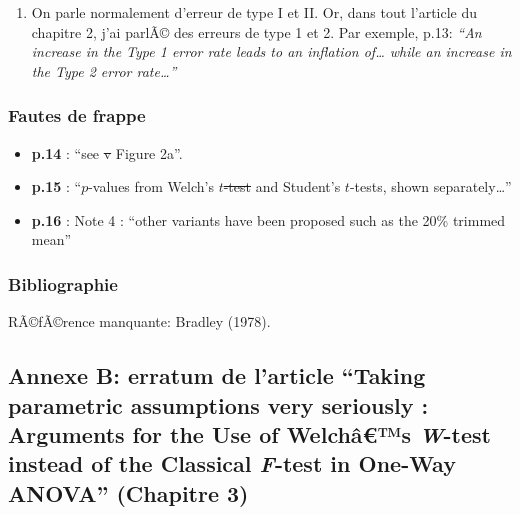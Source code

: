 \begin{appendix}
\begin{enumerate}
\def\labelenumi{\arabic{enumi})}
\setcounter{enumi}{2}
\tightlist
\item
  On parle normalement d'erreur de type I et II. Or, dans tout l'article
  du chapitre 2, j'ai parlÃ© des erreurs de type 1 et 2. Par exemple,
  p.13: \emph{``An increase in the Type 1 error rate leads to an
  inflation of\ldots{} while an increase in the Type 2 error
  rate\ldots{}''}
\end{enumerate}

\hypertarget{fautes-de-frappe}{%
\subsubsection{Fautes de frappe}\label{fautes-de-frappe}}

\begin{itemize}
\tightlist
\item
  \textbf{p.14} : ``see \sout{v} \color{blue}Figure \color{black} 2a''.
\item
  \textbf{p.15} : ``\(p\)-values from Welch's \sout{\(t\)-test} and
  Student's \(t\)-tests, shown separately\ldots{}''
\item
  \textbf{p.16} : Note 4 : ``other variants have been proposed such as
  the \color{blue}20\% \color{black} trimmed mean''
\end{itemize}

\hypertarget{bibliographie}{%
\subsubsection{Bibliographie}\label{bibliographie}}

RÃ©fÃ©rence manquante: Bradley (1978).

\newpage

\hypertarget{annexe-b-erratum-de-larticle-taking-parametric-assumptions-very-seriously-arguments-for-the-use-of-welchuxe2s-w-test-instead-of-the-classical-f-test-in-one-way-anova-chapitre-3}{%
\subsection{\texorpdfstring{Annexe B: erratum de l'article ``Taking
parametric assumptions very seriously : Arguments for the Use of
Welchâ€™s \emph{W}-test instead of the Classical \emph{F}-test in
One-Way ANOVA'' (Chapitre
3)}{Annexe B: erratum de l'article ``Taking parametric assumptions very seriously : Arguments for the Use of Welchâ€™s W-test instead of the Classical F-test in One-Way ANOVA'' (Chapitre 3)}}\label{annexe-b-erratum-de-larticle-taking-parametric-assumptions-very-seriously-arguments-for-the-use-of-welchuxe2s-w-test-instead-of-the-classical-f-test-in-one-way-anova-chapitre-3}}


\end{appendix}
